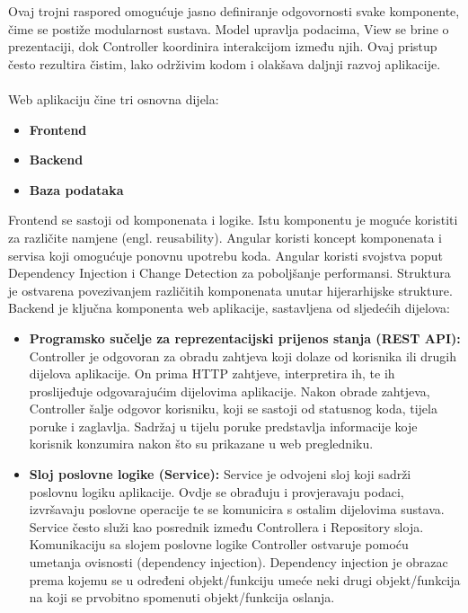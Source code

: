 {			Ovaj trojni raspored omogućuje jasno definiranje odgovornosti svake komponente, čime se postiže modularnost sustava. Model upravlja podacima, View se brine o prezentaciji, dok Controller koordinira interakcijom između njih. Ovaj pristup često rezultira čistim, lako održivim kodom i olakšava daljnji razvoj aplikacije.
			\\
			\\
			Web aplikaciju čine tri osnovna dijela:
			\begin{itemize}
				\item \textbf{Frontend}
				\item \textbf{Backend}
				\item \textbf{Baza podataka}
			\end{itemize}
			
			Frontend se sastoji od komponenata i logike. Istu komponentu je moguće koristiti za različite namjene (engl. reusability). Angular koristi koncept komponenata i servisa koji omogućuje ponovnu upotrebu koda.  Angular koristi svojstva poput Dependency Injection i Change Detection za poboljšanje performansi. Struktura je ostvarena povezivanjem različitih komponenata unutar hijerarhijske strukture.\\
			
			Backend je ključna komponenta web aplikacije, sastavljena od sljedećih dijelova:
			
			\begin{itemize}
				\item \textbf{Programsko sučelje za reprezentacijski prijenos stanja (REST API):}
				Controller je odgovoran za obradu zahtjeva koji dolaze od korisnika ili drugih dijelova aplikacije. On prima HTTP zahtjeve, interpretira ih, te ih proslijeđuje odgovarajućim dijelovima aplikacije. Nakon obrade zahtjeva, Controller šalje odgovor korisniku, koji se sastoji od statusnog koda, tijela poruke i zaglavlja. Sadržaj u tijelu poruke predstavlja informacije koje korisnik konzumira nakon što su prikazane u web pregledniku.
				
				\item \textbf{Sloj poslovne logike (Service):}
				Service je odvojeni sloj koji sadrži poslovnu logiku aplikacije. Ovdje se obrađuju i provjeravaju podaci, izvršavaju poslovne operacije te se komunicira s ostalim dijelovima sustava. Service često služi kao posrednik između Controllera i Repository sloja. Komunikaciju sa slojem poslovne logike Controller ostvaruje pomoću umetanja ovisnosti (dependency injection). Dependency injection je obrazac prema kojemu se u određeni objekt/funkciju umeće neki drugi objekt/funkcija na koji se prvobitno spomenuti objekt/funkcija oslanja.
				

\end{itemize}}
